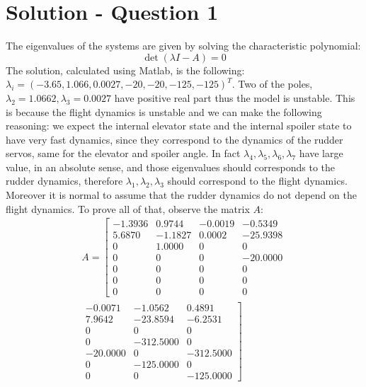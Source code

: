 \section*{Solution - Question 1}
\label{sec:sol1}
The eigenvalues of the systems are given by solving the characteristic polynomial:
$$\det(\lambda I -A)=0$$
The solution, calculated using Matlab, is the following:\\
$\lambda_i=(-3.65,1.066,0.0027,-20,-20,-125,-125)^T$. Two of the poles, $\lambda_2=1.0662, \lambda_3 = 0.0027$ have positive real part thus the model is unstable.
This is because the flight dynamics is unstable and we can make the following reasoning: we expect the internal elevator state and the internal spoiler state to have very fast dynamics, since they correspond to the dynamics of the rudder servos, same for the elevator and spoiler angle. In fact  $\lambda_4,\lambda_5,\lambda_6,\lambda_7$  have large value, in an absolute sense, and those eigenvalues should corresponds to the rudder dynamics, therefore $\lambda_1,\lambda_2,\lambda_3$ should correspond to the flight dynamics. Moreover it is normal to assume that the rudder dynamics do not depend on the flight dynamics. To prove all of that, observe the matrix $A$:\begin{multline}
A=
\left[
\begin{matrix}
   -1.3936 &   0.9744  & -0.0019&   -0.5349   \\
  5.6870 &  -1.1827 &   0.0002  &-25.9398 \\
   0 &   1.0000  &       0   &      0  \\
   0  &       0    &     0  & -20.0000  \\
  0   &      0    &     0   &      0 \\
  0  &       0     &    0    &     0   \\
   0   &      0      &   0     &    0
\end{matrix}
\right.
\\
\left.
\begin{matrix}
 -0.0071  & -1.0562  &  0.4891 \\
  7.9642 & -23.8594 &  -6.2531 \\
   0        & 0  &       0\\
    0& -312.5000    &     0\\
  -20.0000        & 0 &-312.5000 \\
  0& -125.0000   &      0 \\
  0&         0 &-125.0000
\end{matrix}
\right]
\end{multline}
